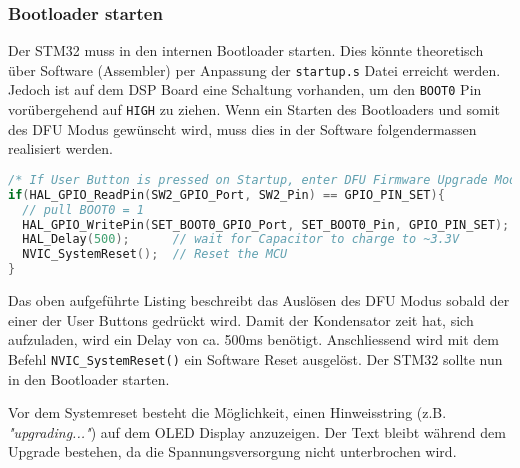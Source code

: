 \subsubsection{Bootloader starten}
\label{sec:Enter_DFU}

Der STM32 muss in den internen Bootloader starten. Dies könnte theoretisch über Software (Assembler) per Anpassung der \texttt{startup.s} Datei erreicht werden.
Jedoch ist auf dem DSP Board eine Schaltung vorhanden, um den \texttt{BOOT0} Pin vorübergehend auf \texttt{HIGH} zu ziehen.
Wenn ein Starten des Bootloaders und somit des DFU Modus gewünscht wird, muss dies in der Software folgendermassen realisiert werden.

\begin{lstlisting}[language=c]
/* If User Button is pressed on Startup, enter DFU Firmware Upgrade Mode */
if(HAL_GPIO_ReadPin(SW2_GPIO_Port, SW2_Pin) == GPIO_PIN_SET){
  // pull BOOT0 = 1
  HAL_GPIO_WritePin(SET_BOOT0_GPIO_Port, SET_BOOT0_Pin, GPIO_PIN_SET);
  HAL_Delay(500);      // wait for Capacitor to charge to ~3.3V
  NVIC_SystemReset();  // Reset the MCU
}
\end{lstlisting}

Das oben aufgeführte Listing beschreibt das Auslösen des DFU Modus sobald der einer der User Buttons gedrückt wird.
Damit der Kondensator zeit hat, sich aufzuladen, wird ein Delay von ca. 500ms benötigt.
Anschliessend wird mit dem Befehl \texttt{NVIC\_SystemReset()} ein Software Reset ausgelöst.
Der STM32 sollte nun in den Bootloader starten.

Vor dem Systemreset besteht die Möglichkeit, einen Hinweisstring (z.B. \textit{"upgrading..."}) auf dem OLED Display anzuzeigen.
Der Text bleibt während dem Upgrade bestehen, da die Spannungsversorgung nicht unterbrochen wird.



